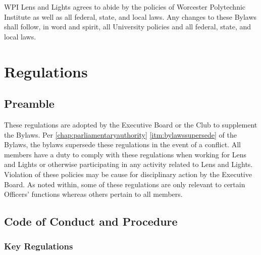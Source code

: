 \documentclass[12pt,letterpaper,oneside]{book}
\begin{document}
WPI Lens and Lights agrees to abide by the policies of Worcester Polytechnic Institute as well as all federal, state, and local laws. Any changes to these Bylaws shall follow, in word and spirit, all University policies and all federal, state, and local laws.

\part{Regulations}

\renewcommand{\chaptername}{Chapter}

\chapter{Preamble}

These regulations are adopted by the Executive Board or the Club to supplement the Bylaws. Per \cref{chap:parliamentaryauthority} \cref{itm:bylawssupersede} of the Bylaws, the bylaws supersede these regulations in the event of a conflict. All members have a duty to comply with these regulations when working for Lens and Lights or otherwise participating in any activity related to Lens and Lights. Violation of these policies may be cause for disciplinary action by the Executive Board. As noted within, some of these regulations are only relevant to certain Officers' functions whereas others pertain to all members.

\chapter{Code of Conduct and Procedure}

\section{Key Regulations}
\end{document}
